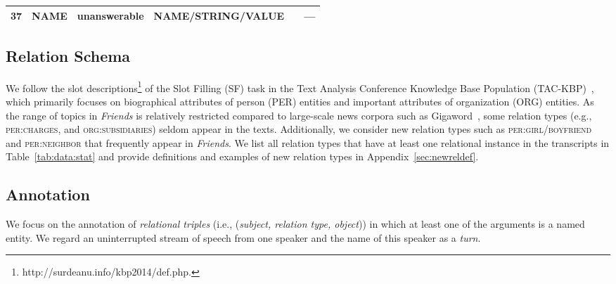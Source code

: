 \documentclass[11pt,a4paper]{article}
\newcommand{\eg}{{e.g.}}
\newcommand{\ie}{{i.e.}}
\begin{document}
\begin{table*}[ht!]
\begin{tabular}{llllll}
37 & NAME & unanswerable                  & NAME/STRING/VALUE   &                                         & ---\\
\bottomrule
\end{tabular}
\caption{Relation Types in DialogRE. Relation types with  represent the existing relation types defined in the TAC-KBP SF task, and we combine three SF fine-grained relation types about cities, states, and countries in a single relation type with . TR: Trigger ratio, representing the percentage of relational triples of a certain relation type that are accompanied by triggers.}
\label{tab:data:stat}
\end{table*}









\subsection{Relation Schema}
\label{sec:sec:rel_schema}
We follow the slot descriptions\footnote{http://surdeanu.info/kbp2014/def.php.} of the Slot Filling (SF) task in the Text Analysis Conference Knowledge Base Population (TAC-KBP)~\cite{mcnamee2009overview,ji2010overview,ji2011overview,surdeanu2013overview,surdeanu2014overview}, which primarily focuses on biographical attributes of person (PER) entities and important attributes of organization (ORG) entities. As the range of topics in \emph{Friends} is relatively restricted compared to large-scale news corpora such as Gigaword~\cite{parker2011english}, some relation types (\eg, \textsc{per:charges}, and \textsc{org:subsidiaries}) seldom appear in the texts. Additionally, we consider new relation types such as \textsc{per:girl/boyfriend} and \textsc{per:neighbor} that frequently appear in \emph{Friends}. We list all  relation types that have at least one relational instance in the transcripts in Table~\ref{tab:data:stat} and provide definitions and examples of new relation types in Appendix~\ref{sec:newreldef}. 


\subsection{Annotation}
\label{sec:sec:annotation}

We focus on the annotation of \emph{relational triples} (\ie, (\emph{subject, relation type, object})) in which at least one of the arguments is a named entity. We regard an uninterrupted stream of speech from one speaker and the name of this speaker as a \emph{turn}. 
\end{document}
